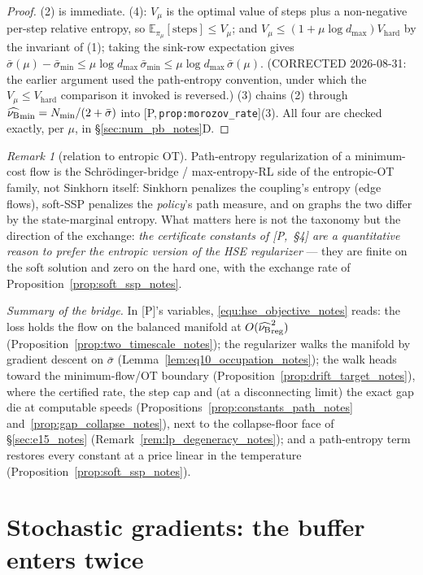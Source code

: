 \documentclass[11pt]{article}
\theoremstyle{definition}
\theoremstyle{remark}
\newtheorem{remark}[theorem]{Remark}
\def\lambda{\widehat\nuB}
\newcommand{\paperref}[1]{[P,\,\texttt{#1}]}   %
\begin{document}
\begin{proof}
(2) is immediate. (4): $V_\mu$ is the optimal value of steps plus a non-negative
per-step relative entropy, so $\mathbb E_{\pi_\mu}[\text{steps}]\leq V_\mu$; and
$V_\mu\leq(1+\mu\log d_{\max})V_{\mathrm{hard}}$ by the invariant of (1); taking the
sink-row expectation gives
$\bar\sigma(\mu)-\bar\sigma_{\min}\leq\mu\log d_{\max}\,\bar\sigma_{\min}
\leq\mu\log d_{\max}\,\bar\sigma(\mu)$. (CORRECTED 2026-08-31: the earlier argument
used the path-entropy convention, under which the $V_\mu\leq V_{\mathrm{hard}}$
comparison it invoked is reversed.) (3) chains (2) through
$\lambda_{\min} = N_{\min}/(2+\bar\sigma)$ into
\paperref{prop:morozov\_rate}(3). All four are checked exactly, per $\mu$, in
\S\ref{sec:num_pb_notes}D.
\end{proof}

\begin{remark}[relation to entropic OT]\label{rem:entropic_ot_notes}
Path-entropy regularization of a minimum-cost flow is the Schr\"odinger-bridge /
max-entropy-RL side of the entropic-OT family, not Sinkhorn itself: Sinkhorn penalizes
the coupling's entropy (edge flows), soft-SSP penalizes the \emph{policy}'s path
measure, and on graphs the two differ by the state-marginal entropy. What matters here
is not the taxonomy but the direction of the exchange: \emph{the certificate constants
of [P,~\S4] are a quantitative reason to prefer the entropic version of the HSE
regularizer} --- they are finite on the soft solution and zero on the hard one, with
the exchange rate of Proposition~\ref{prop:soft_ssp_notes}.
\end{remark}

\emph{Summary of the bridge.} In [P]'s variables, \eqref{equ:hse_objective_notes} reads: the
loss holds the flow on the balanced manifold at $O(\lamreg^2)$
(Proposition~\ref{prop:two_timescale_notes}); the regularizer walks the manifold by gradient
descent on $\bar\sigma$ (Lemma~\ref{lem:eq10_occupation_notes}); the walk heads toward the
minimum-flow/OT boundary (Proposition~\ref{prop:drift_target_notes}), where the certified rate,
the step cap and (at a disconnecting limit) the exact gap die at computable speeds
(Propositions~\ref{prop:constants_path_notes} and~\ref{prop:gap_collapse_notes}), next to the
collapse-floor face of \S\ref{sec:e15_notes} (Remark~\ref{rem:lp_degeneracy_notes}); and a
path-entropy term restores every constant at a price linear in the temperature
(Proposition~\ref{prop:soft_ssp_notes}).

\section{Stochastic gradients: the buffer enters twice}\label{sec:sgd_notes}
\end{document}
